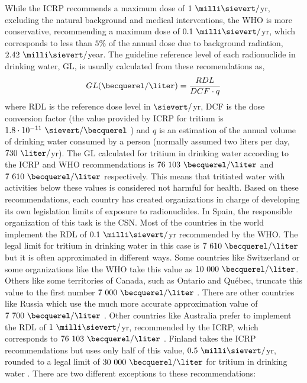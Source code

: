 While the ICRP recommends a maximum dose of $1~\milli\sievert/$yr, excluding the natural background and medical interventions, the WHO is more conservative, recommending a maximum dose of $0.1~\milli\sievert/$yr, which corresponds to less than $5\%$ of the annual dose due to background radiation, $2.42~\milli\sievert/$year. The guideline reference level of each radionuclide in drinking water, GL, is usually calculated from these recomendations as,
\begin{equation}
GL (\becquerel/\liter) = \frac{RDL}{DCF \cdot{} q}
\label{eq:Guideline}
\end{equation}
where RDL is the reference dose level in $\sievert/$yr, DCF is the dose conversion factor (the value provided by ICRP for tritium is $1.8 \cdot{} 10^{-11}~\sievert/ \becquerel$ \cite{ICRP_factor}) and $q$ is an estimation of the annual volume of drinking water consumed by a person (normally assumed two liters per day, $730~\liter/$yr). The GL calculated for tritium in drinking water according to the ICRP and WHO recommendations is $76~103~\becquerel/\liter$ and $7~610~\becquerel/\liter$  respectively. This means that tritiated water with activities below these values is considered not harmful for health. Based on these recommendations, each country has created organizations in charge of developing its own legislation limits of exposure to radionuclides. In Spain, the responsible organization of this task is the CSN. Most of the countries in the world implement the RDL of $0.1~\milli\sievert/$yr recommended by the WHO. The legal limit for tritium in drinking water in this case is $7~610~\becquerel/\liter$  but it is often approximated in different ways. Some countries like Switzerland \cite{Switzerland_GL} or some organizations like the WHO \cite{WHO_GL} take this value as $10~000~\becquerel/\liter$. Others like some territories of Canada, such as Ontario and Québec, truncate this value to the first number $7~000~\becquerel/\liter$ \cite{Ontario_GL, Quebec_GL}. There are other countries like Russia which use the much more accurate approximation value of $7~700~\becquerel/\liter$ \cite{Russia_GL}. Other countries like Australia prefer to implement the RDL of $1~\milli\sievert/$yr, recommended by the ICRP, which corresponds to $76~103~\becquerel/\liter$ \cite{Australia_GL}. Finland takes the ICRP recommendations but uses only half of this value, $0.5~\milli\sievert/$yr, rounded to a legal limit of $30~000~\becquerel/\liter$ for tritium in drinking water \cite{Finland_GL}. There are two different exceptions to these recommendations:
